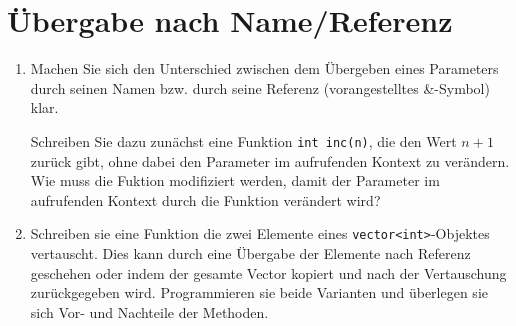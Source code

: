 \documentclass[paper=a4, fontsize=11pt, twoside]{scrartcl}
\begin{document}
\section*{Übergabe nach Name/Referenz}
\begin{enumerate}[resume]
\item Machen Sie sich den Unterschied zwischen dem Übergeben eines Parameters durch seinen Namen bzw. durch seine Referenz (vorangestelltes \textrm{\&}-Symbol) klar. \par
  Schreiben Sie dazu zunächst eine Funktion \texttt{int inc(n)}, die den Wert $n+1$ zurück gibt, ohne dabei den Parameter im aufrufenden Kontext zu verändern. \\
  Wie muss die Fuktion modifiziert werden, damit der Parameter im aufrufenden Kontext durch die Funktion verändert wird? 
  \item Schreiben sie eine Funktion die zwei Elemente eines \texttt{vector<int>}-Objektes vertauscht. 
	  Dies kann durch eine Übergabe der Elemente nach Referenz geschehen oder indem der gesamte Vector kopiert und nach der Vertauschung zurückgegeben wird. Programmieren sie beide Varianten und überlegen sie sich Vor- und Nachteile der Methoden.
\end{enumerate}
\end{document}
